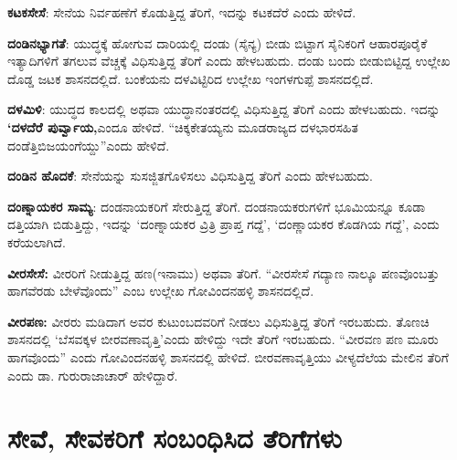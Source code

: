 \textbf{ಕಟಕಸೇಸೆ}: ಸೇನೆಯ ನಿರ್ವಹಣೆಗೆ ಕೊಡುತ್ತಿದ್ದ ತೆರಿಗೆ, ಇದನ್ನು ಕಟಕದೆರೆ ಎಂದು ಹೇಳಿದೆ.

\textbf{ದಂಡಿನಭ್ಯಾಗತೆ}: ಯುದ್ಧಕ್ಕೆ ಹೋಗುವ ದಾರಿಯಲ್ಲಿ ದಂಡು (ಸೈನ್ಯ) ಬೀಡು ಬಿಟ್ಟಾಗ ಸೈನಿಕರಿಗೆ ಆಹಾರಪೂರೈಕೆ ಇತ್ಯಾದಿಗಳಿಗೆ ತಗಲುವ ವೆಚ್ಚಕ್ಕೆ ವಿಧಿಸುತ್ತಿದ್ದ ತೆರಿಗೆ ಎಂದು ಹೇಳಬಹುದು. ದಂಡು ಬಂದು ಬೀಡುಬಿಟ್ಟಿದ್ದ ಉಲ್ಲೇಖ ದೊಡ್ಡ ಜಟಕ ಶಾಸನದಲ್ಲಿದೆ. ಬಂಕೆಯನು ದಳವಿಟ್ಟಿರಿದ ಉಲ್ಲೇಖ ಇಂಗಳಗುಪ್ಪೆ ಶಾಸನದಲ್ಲಿದೆ.

\textbf{ದಳಮಿಳಿ}: ಯುದ್ಧದ ಕಾಲದಲ್ಲಿ ಅಥವಾ ಯುದ್ಧಾನಂತರದಲ್ಲಿ ವಿಧಿಸುತ್ತಿದ್ದ ತೆರಿಗೆ ಎಂದು ಹೇಳಬಹುದು. ಇದನ್ನು \textbf{‘ದಳದೆರೆ ಪುರ್ವ್ವಾಯ,}ಎಂದೂ ಹೇಳಿದೆ. “ಚಿಕ್ಕಕೇತಯ್ಯನು ಮೂಡರಾಜ್ಯದ ದಳಭಾರಸಹಿತ ದಂಡೆತ್ತಿ\break ಬಿಜಯಂಗೆಯ್ದು”ಎಂದು ಹೇಳಿದೆ.

\textbf{ದಂಡಿನ ಹೊದಕೆ}: ಸೇನೆಯನ್ನು ಸುಸಜ್ಜಿತಗೊಳಿಸಲು ವಿಧಿಸುತ್ತಿದ್ದ ತೆರಿಗೆ ಎಂದು ಹೇಳಬಹುದು.

\textbf{ದಂಣ್ನಾಯಕರ ಸಾಮ್ಯ}: ದಂಡನಾಯಕರಿಗೆ ಸೇರುತ್ತಿದ್ದ ತೆರಿಗೆ. ದಂಡನಾಯಕರುಗಳಿಗೆ ಭೂಮಿಯನ್ನೂ ಕೂಡಾ ದತ್ತಿಯಾಗಿ ಬಿಡುತ್ತಿದ್ದು, ಇದನ್ನು ‘ದಂಣ್ನಾಯಕರ ವ್ರಿತ್ರಿ ಪ್ರಾಪ್ತ ಗದ್ದೆ’, ‘ದಂಣ್ಣಾಯಕರ ಕೊಡಗಿಯ ಗದ್ದೆ’, ಎಂದು ಕರೆಯಲಾಗಿದೆ.

\textbf{ವೀರಸೇಸೆ:} ವೀರರಿಗೆ ನೀಡುತ್ತಿದ್ದ ಹಣ(ಇನಾಮು) ಅಥವಾ ತೆರಿಗೆ. “ವೀರಸೇಸೆ ಗದ್ಯಾಣ ನಾಲ್ಕೂ ಪಣವೊಂಬತ್ತು ಹಾಗವೆರಡು ಬೇಳೆವೊಂದು” ಎಂಬ ಉಲ್ಲೇಖ ಗೋವಿಂದನಹಳ್ಳಿ ಶಾಸನದಲ್ಲಿದೆ.

\textbf{ವೀರಪಣ:} ವೀರರು ಮಡಿದಾಗ ಅವರ ಕುಟುಂಬದವರಿಗೆ ನೀಡಲು ವಿಧಿಸುತ್ತಿದ್ದ ತೆರಿಗೆ ಇರಬಹುದು. ತೊಣಚಿ ಶಾಸನದಲ್ಲಿ ‘ಬೆಸವಕ್ಕಳ ಬೀರವಣಾವೃತ್ತಿ’ಎಂದು ಹೇಳಿದ್ದು ಇದೇ ತೆರಿಗೆ ಇರಬಹುದು. “ವೀರವಣ ಪಣ ಮೂರು ಹಾಗವೊಂದು” ಎಂದು ಗೋವಿಂದನಹಳ್ಳಿ ಶಾಸನದಲ್ಲಿ ಹೇಳಿದೆ. ಬೀರವಣಾವೃತ್ತಿಯು ವೀಳ್ಯದೆಲೆಯ ಮೇಲಿನ ತೆರಿಗೆ ಎಂದು ಡಾ. ಗುರುರಾಜಾಚಾರ್​ ಹೇಳಿದ್ದಾರೆ.

\section{ಸೇವೆ, ಸೇವಕರಿಗೆ ಸಂಬಂಧಿಸಿದ ತೆರಿಗೆಗಳು}

